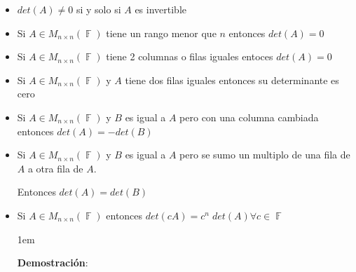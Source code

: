 \documentclass[12pt, fleqn]{report}                             %
\newenvironment{SmallIndentation}[1][0.75em]                    %
        {\begin{adjustwidth}{#1}{}\begin{footnotesize}}             %
        {\end{footnotesize}\end{adjustwidth}}                       %
\theoremstyle{break}                                            %
\DeclareMathOperator \GenericField {\mathbb{F}}                 %
\begin{document}
                \begin{itemize}

                    \item
                        $det(A) \neq 0$ si y solo si $A$ es invertible

                    \item
                        Si $A \in M_{n \times n}(\GenericField)$ tiene un rango menor que $n$
                        entonces $det(A) = 0$

                    \item
                        Si $A \in M_{n \times n}(\GenericField)$ tiene 2 columnas o filas iguales entoces
                        $det(A) = 0$

                    \item
                        Si $A \in M_{n \times n}(\GenericField)$ y $A$ tiene dos filas iguales
                        entonces su determinante es cero

                    \item
                        Si $A \in M_{n \times n}(\GenericField)$ y $B$ es igual a $A$ pero con una
                        columna cambiada entonces $det(A) = - det(B)$

                    \item
                        Si $A \in M_{n \times n}(\GenericField)$ y $B$ es igual a $A$ pero se sumo un
                        multiplo de una fila de $A$ a otra fila de $A$.

                        Entonces $det(A) = det(B)$

                    \item
                        Si $A \in M_{n \times n}(\GenericField)$ entonces $det(cA) = c^n \; det(A) \forall c \in \GenericField$

                        \begin{SmallIndentation}[1em]
                            \textbf{Demostración}:
                            

\end{SmallIndentation}
\end{itemize}
\end{document}
